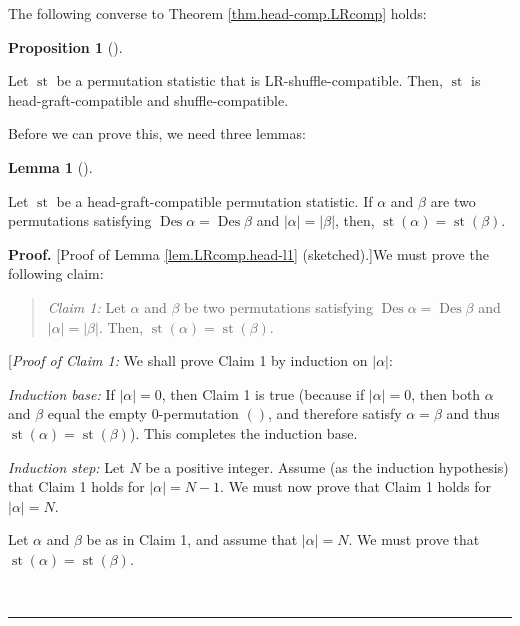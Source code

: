 \documentclass[numbers=enddot,12pt,final,onecolumn,notitlepage]{scrartcl}%
\theoremstyle{definition}
\newtheorem{lem}[theo]{Lemma}
\newenvironment{lemma}[1][]
{\begin{lem}[#1]\begin{leftbar}}
{\end{leftbar}\end{lem}}
\newtheorem{prop}[theo]{Proposition}
\newenvironment{proposition}[1][]
{\begin{prop}[#1]\begin{leftbar}}
{\end{leftbar}\end{prop}}
\newenvironment{statement}{\begin{quote}}{\end{quote}}
\newenvironment{proof}[1][Proof]{\noindent\textbf{#1.} }{\ \rule{0.5em}{0.5em}}
\newenvironment{verlong}{}{}
\begin{document}
\begin{verlong}
The following converse to Theorem \ref{thm.head-comp.LRcomp} holds:

\begin{proposition}
\label{prop.LRcomp.head}Let $\operatorname*{st}$ be a permutation statistic
that is LR-shuffle-compatible. Then, $\operatorname*{st}$ is
head-graft-compatible and shuffle-compatible.
\end{proposition}

Before we can prove this, we need three lemmas:

\begin{lemma}
\label{lem.LRcomp.head-l1}Let $\operatorname*{st}$ be a head-graft-compatible
permutation statistic. If $\alpha$ and $\beta$ are two permutations satisfying
$\operatorname*{Des}\alpha=\operatorname*{Des}\beta$ and $\left\vert
\alpha\right\vert =\left\vert \beta\right\vert $, then, $\operatorname*{st}%
\left(  \alpha\right)  =\operatorname*{st}\left(  \beta\right)  $.
\end{lemma}

\begin{proof}
[Proof of Lemma \ref{lem.LRcomp.head-l1} (sketched).]We must prove the
following claim:

\begin{statement}
\textit{Claim 1:} Let $\alpha$ and $\beta$ be two permutations satisfying
$\operatorname*{Des}\alpha=\operatorname*{Des}\beta$ and $\left\vert
\alpha\right\vert =\left\vert \beta\right\vert $. Then, $\operatorname*{st}%
\left(  \alpha\right)  =\operatorname*{st}\left(  \beta\right)  $.
\end{statement}

[\textit{Proof of Claim 1:} We shall prove Claim 1 by induction on $\left\vert
\alpha\right\vert $:

\textit{Induction base:} If $\left\vert \alpha\right\vert =0$, then Claim 1 is
true (because if $\left\vert \alpha\right\vert =0$, then both $\alpha$ and
$\beta$ equal the empty $0$-permutation $\left(  {}\right)  $, and therefore
satisfy $\alpha=\beta$ and thus $\operatorname*{st}\left(  \alpha\right)
=\operatorname*{st}\left(  \beta\right)  $). This completes the induction base.

\textit{Induction step:} Let $N$ be a positive integer. Assume (as the
induction hypothesis) that Claim 1 holds for $\left\vert \alpha\right\vert
=N-1$. We must now prove that Claim 1 holds for $\left\vert \alpha\right\vert
=N$.

Let $\alpha$ and $\beta$ be as in Claim 1, and assume that $\left\vert
\alpha\right\vert =N$. We must prove that $\operatorname*{st}\left(
\alpha\right)  =\operatorname*{st}\left(  \beta\right)  $.


\end{proof}
\end{verlong}
\end{document}
